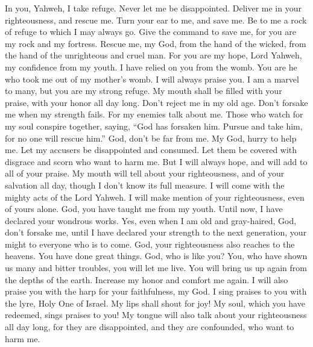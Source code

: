  In you, Yahweh, I take refuge. Never let me be
disappointed.  Deliver me in your righteousness, and
rescue me. Turn your ear to me, and save me.  Be to me a
rock of refuge to which I may always go. Give the command to save me,
for you are my rock and my fortress.  Rescue me, my God,
from the hand of the wicked, from the hand of the unrighteous and cruel
man.  For you are my hope, Lord Yahweh, my confidence from
my youth.  I have relied on you from the womb. You are he
who took me out of my mother's womb. I will always praise you.
 I am a marvel to many, but you are my strong refuge.
 My mouth shall be filled with your praise, with your
honor all day long.  Don't reject me in my old age. Don't
forsake me when my strength fails.  For my enemies talk
about me. Those who watch for my soul conspire together, 
saying, ``God has forsaken him. Pursue and take him, for no one will
rescue him.''  God, don't be far from me. My God, hurry
to help me.  Let my accusers be disappointed and
consumed. Let them be covered with disgrace and scorn who want to harm
me.  But I will always hope, and will add to all of your
praise.  My mouth will tell about your righteousness, and
of your salvation all day, though I don't know its full measure.
 I will come with the mighty acts of the Lord Yahweh. I
will make mention of your righteousness, even of yours alone.
 God, you have taught me from my youth. Until now, I have
declared your wondrous works.  Yes, even when I am old
and gray-haired, God, don't forsake me, until I have declared your
strength to the next generation, your might to everyone who is to come.
 God, your righteousness also reaches to the heavens. You
have done great things. God, who is like you?  You, who
have shown us many and bitter troubles, you will let me live. You will
bring us up again from the depths of the earth.  Increase
my honor and comfort me again.  I will also praise you
with the harp for your faithfulness, my God. I sing praises to you with
the lyre, Holy One of Israel.  My lips shall shout for
joy! My soul, which you have redeemed, sings praises to you!
 My tongue will also talk about your righteousness all
day long, for they are disappointed, and they are confounded, who want
to harm me.

